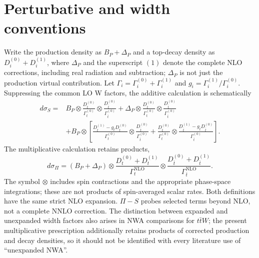 \documentclass[11pt,a4paper]{article}
\begin{document}
\section{Perturbative and width conventions}
Write the production density as $B_P+\Delta_P$ and a top-decay density as
$D_i^{(0)}+D_i^{(1)}$, where $\Delta_P$ and the superscript $(1)$ denote the complete NLO
corrections, including real radiation and subtraction; $\Delta_P$ is not
just the production virtual contribution. Let
$\Gamma_i=\Gamma_i^{(0)}+\Gamma_i^{(1)}$ and
$g_i=\Gamma_i^{(1)}/\Gamma_i^{(0)}$. Suppressing the common LO W factors,
the additive calculation is schematically
\begin{align}
 d\sigma_S={}&B_P\otimes\frac{D_t^{(0)}}{\Gamma_t^{(0)}}
                  \otimes\frac{D_{\bar t}^{(0)}}{\Gamma_{\bar t}^{(0)}}
 +\Delta_P\otimes\frac{D_t^{(0)}}{\Gamma_t^{(0)}}
                  \otimes\frac{D_{\bar t}^{(0)}}{\Gamma_{\bar t}^{(0)}}\nonumber\\
 &+B_P\otimes\left[
 \frac{D_t^{(1)}-g_tD_t^{(0)}}{\Gamma_t^{(0)}}
       \otimes\frac{D_{\bar t}^{(0)}}{\Gamma_{\bar t}^{(0)}}
 +\frac{D_t^{(0)}}{\Gamma_t^{(0)}}
       \otimes\frac{D_{\bar t}^{(1)}-g_{\bar t}D_{\bar t}^{(0)}}{\Gamma_{\bar t}^{(0)}}
 \right].
\end{align}
The multiplicative calculation retains products,
\begin{equation}
 d\sigma_\Pi=(B_P+\Delta_P)\otimes
 \frac{D_t^{(0)}+D_t^{(1)}}{\Gamma_t^{\mathrm{NLO}}}\otimes
 \frac{D_{\bar t}^{(0)}+D_{\bar t}^{(1)}}{\Gamma_{\bar t}^{\mathrm{NLO}}}.
\end{equation}
The symbol $\otimes$ includes spin contractions and the appropriate
phase-space integrations; these are not products of spin-averaged scalar
rates. Both definitions have the same strict NLO expansion. $\Pi-S$ probes
selected terms beyond NLO, not a complete NNLO correction. The distinction
between expanded and unexpanded width factors also arises in NWA
comparisons for $t\bar tW$\cite{ttW2020}; the present multiplicative
prescription additionally retains products of corrected production and
decay densities, so it should not be identified with every literature use
of ``unexpanded NWA''.
\end{document}

